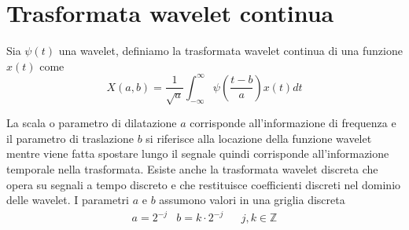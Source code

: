 \section{Trasformata wavelet continua}
Sia $\psi(t)$ una wavelet, definiamo la trasformata wavelet continua di una funzione $x(t)$ come 
\[
  X(a,b)=\displaystyle \frac{1}{\sqrt{a}}\displaystyle\int_{-\infty}^{\infty} \psi \left( \frac{t-b}{a} \right) x(t) dt
\]

La scala o parametro di dilatazione $a$ corrisponde all'informazione di frequenza e il parametro di traslazione $b$ si riferisce alla locazione della funzione wavelet mentre viene fatta spostare lungo il segnale quindi corrisponde all'informazione temporale nella trasformata.
Esiste anche la trasformata wavelet discreta che opera su segnali a tempo discreto e che restituisce coefficienti discreti nel dominio delle wavelet.
I parametri $a$ e $b$ assumono valori in una griglia discreta
\[
  \begin{array}{llll}
      a=2^{-j}
    &
      b=k\cdot 2^{-j}
    &
     
    &
      j,k\in \mathbb{Z}
  \end{array}
\]


\cite{wavelet1}\cite{wavelet2}

